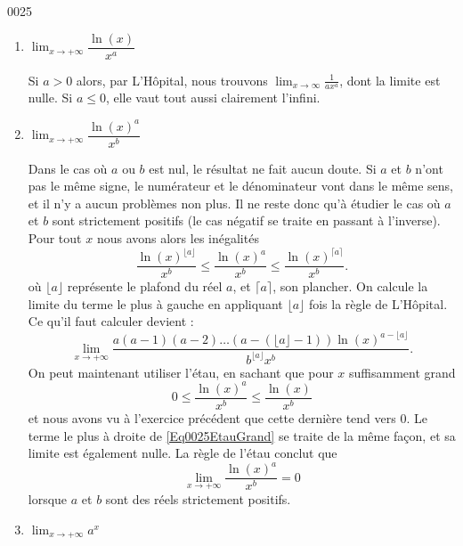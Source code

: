 
\begin{corrige}{0025}



\begin{enumerate}
\item 
 $\lim_{x\rightarrow +\infty} \dfrac{\ln(x)}{x^a}  $

Si $a>0$ alors, par L'Hôpital, nous trouvons $\lim_{x\to\infty}\frac{1}{ ax^a }$, dont la limite est nulle. Si $a\leq0$, elle vaut tout aussi clairement l'infini.

\item
  $\lim_{x\rightarrow +\infty} \dfrac{\ln(x)^a}{x^b}  $

Dans le cas où $a$ ou $b$ est nul, le résultat ne fait aucun doute. Si $a$ et $b$ n'ont pas le même signe, le numérateur et le dénominateur vont dans le même sens, et il n'y a aucun problèmes non plus. Il ne reste donc qu'à étudier le cas où $a$ et $b$ sont strictement positifs (le cas négatif se traite en passant à l'inverse). Pour tout $x$ nous avons alors les inégalités
\begin{equation}		\label{Eq0025EtauGrand}
	\frac{ \ln(x)^{\lfloor a\rfloor} }{ x^b }\leq\frac{ \ln(x)^{a} }{ x^b }\leq\frac{ \ln(x)^{\lceil a\rceil} }{ x^b }.
\end{equation}
où $\lfloor a \rfloor$ représente le plafond du réel $a$, et $\lceil a\rceil$, son plancher. On calcule la limite du terme le plus à gauche en appliquant $\lfloor a\rfloor$ fois la règle de L'Hôpital. Ce qu'il faut calculer devient :
\[ 
\lim_{x\rightarrow +\infty} \dfrac{a(a-1)(a-2)\ldots(a-(\lfloor a \rfloor-1))\ln(x)^{a-\lfloor a \rfloor}}{b^{\lfloor a \rfloor}x^b} .
\]
On peut maintenant utiliser l'étau, en sachant que pour $x$ suffisamment grand \[0 \leq \dfrac{\ln(x)^a}{x^b} \leq \dfrac{\ln(x)}{x^b}\] et nous avons vu à l'exercice précédent que cette dernière tend vers $0$. Le terme le plus à droite de \eqref{Eq0025EtauGrand} se traite de la même façon, et sa limite est également nulle. La règle de l'étau conclut que
\begin{equation}
	\lim_{x\rightarrow +\infty} \dfrac{\ln(x)^a}{x^b}  =0
\end{equation}
lorsque $a$ et $b$ sont des réels strictement positifs.

\item
 $\lim_{x\rightarrow +\infty} a^x $


\end{enumerate}
\end{corrige}
